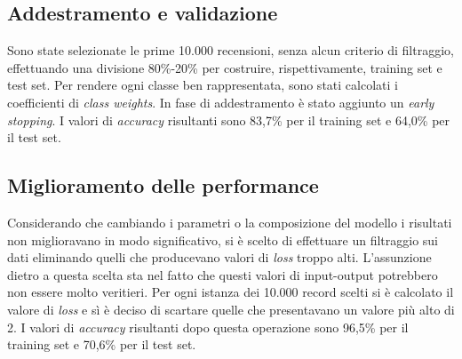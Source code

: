 \documentclass[12pt]{article}
\begin{document}
\subsection{Addestramento e validazione}
Sono state selezionate le prime 10.000 recensioni, senza alcun criterio di filtraggio, effettuando una divisione 80\%-20\% per costruire, rispettivamente, training set e test set. Per rendere ogni classe ben rappresentata, sono stati calcolati i coefficienti di \textit{class weights}.\newline
In fase di addestramento è stato aggiunto un \textit{early stopping}. \newline
I valori di \textit{accuracy} risultanti sono 83,7\% per il training set e   64,0\% per il test set.\newline

\subsection{Miglioramento delle performance}
Considerando che cambiando i parametri o la composizione del modello i risultati non miglioravano in modo significativo, si è scelto di effettuare un filtraggio sui dati eliminando quelli che producevano valori di \textit{loss} troppo alti. L'assunzione dietro a questa scelta sta nel fatto che questi valori di input-output potrebbero non essere molto veritieri.\newline
Per ogni istanza dei 10.000 record scelti si è calcolato il valore di \textit{loss} e sì è deciso di scartare quelle che presentavano un valore più alto di 2.
I valori di \textit{accuracy} risultanti dopo questa operazione sono 96,5\% per il training set e 70,6\% per il test set.\newline
\end{document}

